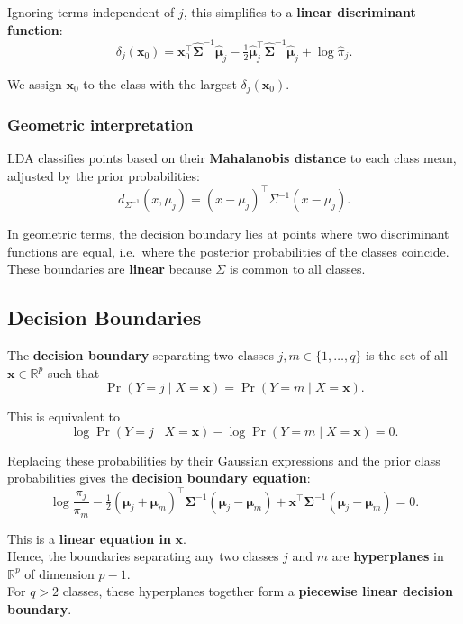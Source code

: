 \documentclass[
  letterpaper,
  DIV=11,
  numbers=noendperiod]{scrartcl}
\begin{document}
Ignoring terms independent of \(j\), this simplifies to a \textbf{linear
discriminant function}:
\[\delta_j(\mathbf{x}_0) = \mathbf{x}_0^{\top}\hat{\boldsymbol{\Sigma}}^{-1}\hat{\boldsymbol{\mu}}_j - \tfrac{1}{2}\hat{\boldsymbol{\mu}}_j^{\top}\hat{\boldsymbol{\Sigma}}^{-1}\hat{\boldsymbol{\mu}}_j + \log \hat{\pi}_j.\]

We assign \(\mathbf{x}_0\) to the class with the largest
\(\delta_j(\mathbf{x}_0)\).

\subsubsection{Geometric interpretation}\label{geometric-interpretation}

LDA classifies points based on their \textbf{Mahalanobis distance} to
each class mean, adjusted by the prior probabilities:
\[d_{\Sigma^{-1}}(x, \mu_j) = (x - \mu_j)^{\top}\Sigma^{-1}(x - \mu_j).\]

In geometric terms, the decision boundary lies at points where two
discriminant functions are equal, i.e.~where the posterior probabilities
of the classes coincide.\\
These boundaries are \textbf{linear} because \(\Sigma\) is common to all
classes.

\subsection{Decision Boundaries}\label{decision-boundaries}

The \textbf{decision boundary} separating two classes
\(j, m \in \{1, \ldots, q\}\) is the set of all
\(\mathbf{x} \in \mathbb{R}^p\) such that
\[\Pr(Y = j \mid X = \mathbf{x}) = \Pr(Y = m \mid X = \mathbf{x}).\]

This is equivalent to
\[\log \Pr(Y = j \mid X = \mathbf{x}) - \log \Pr(Y = m \mid X = \mathbf{x}) = 0.\]

Replacing these probabilities by their Gaussian expressions and the
prior class probabilities gives the \textbf{decision boundary equation}:
\[\log \frac{\pi_j}{\pi_m} - \tfrac{1}{2}(\boldsymbol{\mu}_j + \boldsymbol{\mu}_m)^{\top}\boldsymbol{\Sigma}^{-1}(\boldsymbol{\mu}_j - \boldsymbol{\mu}_m) + \mathbf{x}^{\top}\boldsymbol{\Sigma}^{-1}(\boldsymbol{\mu}_j - \boldsymbol{\mu}_m) = 0.\]

This is a \textbf{linear equation in} \(\mathbf{x}\).\\
Hence, the boundaries separating any two classes \(j\) and \(m\) are
\textbf{hyperplanes} in \(\mathbb{R}^p\) of dimension \(p - 1\).\\
For \(q > 2\) classes, these hyperplanes together form a
\textbf{piecewise linear decision boundary}.
\end{document}
